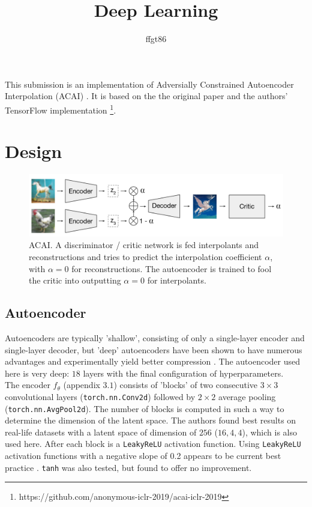 \documentclass[11pt]{article} %
\title{Deep Learning}
\author{ffgt86}
\begin{document}
\maketitle

This submission is an implementation of Adversially Constrained Autoencoder Interpolation (ACAI) \cite{berthelot_et_al_2019}. It is based on the the original paper \cite{berthelot_et_al_2019} and the authors' TensorFlow implementation \footnote{ https://github.com/anonymous-iclr-2019/acai-iclr-2019}.
\section{Design}

\begin{figure}[h!]
  \includegraphics[width=\linewidth]{structure.png}
  \caption{ACAI. A discriminator / critic network is fed interpolants and reconstructions and tries to predict the interpolation coefficient $\alpha$, with $\alpha = 0$ for reconstructions. The autoencoder is trained to fool the critic into outputting $\alpha = 0$ for interpolants.}
\end{figure}

\subsection{Autoencoder}

Autoencoders are typically 'shallow', consisting of only a single-layer encoder and single-layer decoder, but 'deep' autoencoders have been shown to have numerous advantages \cite{goodfellow_et_al_2016} and experimentally yield better compression \cite{hinton_salakhutdinov_2006}. The autoencoder used here is very deep: $18$ layers with the final configuration of hyperparameters.\\

The encoder $f_\theta$ (appendix $3.1$) consists of 'blocks' of two consecutive $3 \times 3$ convolutional layers (\verb|torch.nn.Conv2d|) followed by $2 \times 2$ average pooling (\verb|torch.nn.AvgPool2d|). The number of blocks is computed in such a way to determine the dimension of the latent space. The authors found best results on real-life datasets with a latent space of dimension of $256$ ($16, 4, 4$), which is also used here. After each block is a \verb|LeakyReLU| activation function. Using \verb|LeakyReLU| activation functions with a negative slope of 0.2 appears to be current best practice \cite{berthelot_et_al_2019} \cite{heljakka_solin_kannala_2018}. \verb|tanh| was also tested, but found to offer no improvement.\\
\end{document}
